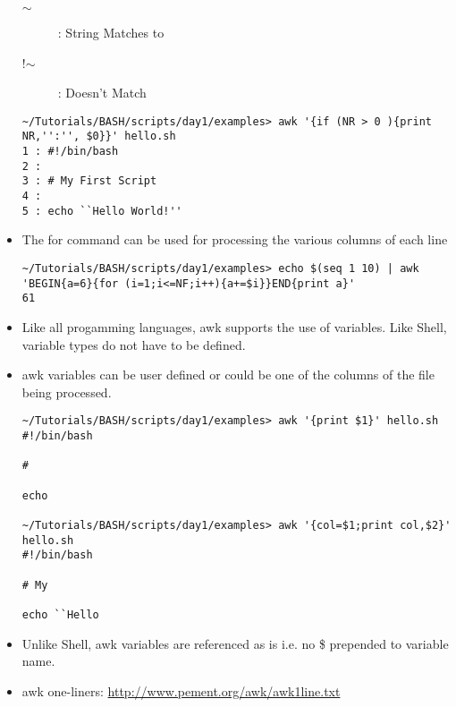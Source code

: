 \documentclass[10pt,t]{beamer}
\begin{document}
\begin{frame}
\begin{itemize}
\begin{description}
        \item[$\sim$]: String Matches to
        \item[!$\sim$]: Doesn't Match
    \end{description}
    \begin{lstlisting}[style=LINUX]
~/Tutorials/BASH/scripts/day1/examples> awk '{if (NR > 0 ){print NR,'':'', $0}}' hello.sh 
1 : #!/bin/bash
2 : 
3 : # My First Script
4 : 
5 : echo ``Hello World!''
    \end{lstlisting}
    \item The for command can be used for processing the various columns of each line
    \begin{lstlisting}[style=LINUX]
~/Tutorials/BASH/scripts/day1/examples> echo $(seq 1 10) | awk 'BEGIN{a=6}{for (i=1;i<=NF;i++){a+=$i}}END{print a}'                                                                                 
61
    \end{lstlisting}
    \item Like all progamming languages, awk supports the use of variables. Like Shell, variable types do not have to be defined.
    \item awk variables can be user defined or could be one of the columns of the file being processed.
    \begin{lstlisting}[style=LINUX]
~/Tutorials/BASH/scripts/day1/examples> awk '{print $1}' hello.sh 
#!/bin/bash

#

echo

~/Tutorials/BASH/scripts/day1/examples> awk '{col=$1;print col,$2}' hello.sh 
#!/bin/bash 
 
# My
 
echo ``Hello
    \end{lstlisting}
    \item Unlike Shell, awk variables are referenced as is i.e. no \$ prepended to variable name.
    \item awk one-liners: \url{http://www.pement.org/awk/awk1line.txt}
  \end{itemize}
\end{frame}
\end{document}
